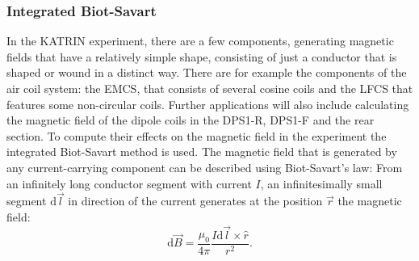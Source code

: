     \subsubsection{Integrated Biot-Savart}
    In the KATRIN experiment, there are a few components, generating magnetic fields that have a relatively simple shape, consisting of just a conductor that is shaped or wound in a distinct way. There are for example the components of the air coil system: the EMCS, that consists of several cosine coils and the LFCS that features some non-circular coils. Further applications will also include calculating the magnetic field of the dipole coils in the DPS1-R, DPS1-F and the rear section. To compute their effects on the magnetic field in the experiment the integrated Biot-Savart method is used. The magnetic field that is generated by any current-carrying component can be described using Biot-Savart’s law: From an infinitely long conductor segment with current $I$, an infinitesimally small segment $\mathrm d\vec{l}$ in direction of the current generates at the position $\vec{r}$ the magnetic field:
    \begin{equation}
      \mathrm d\vec{B} = \frac{\mu_0}{4\pi}\frac{I\mathrm d\vec{l}\times \hat{r}}{r^2}\text{.}
      \label{eq:biot savart}
    \end{equation}
